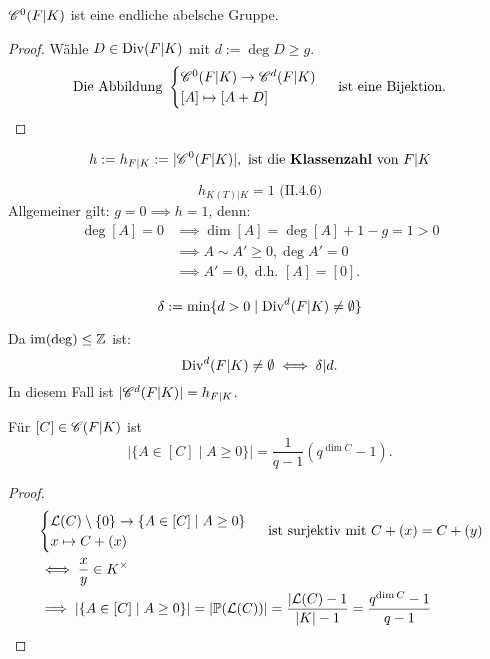 \begin{satz}
    $\Cs^0(F|K)$ ist eine endliche abelsche Gruppe.
\end{satz}
\begin{proof}
    Wähle $D \in \Div(F|K)$ mit $d:=\deg D \geq g$.
    $$ \text{Die Abbildung } \begin{cases}
        \Cs^0(F|K) \to \Cs^d(F|K)\\
        [A] \mapsto [A +D]
    \end{cases} \text{ ist eine Bijektion.}$$
\end{proof}

\begin{definition}
    \begin{align*}
        h := h_{F|K} := |\Cs^0(F|K)|, \text{ ist die \textbf{Klassenzahl} von } F|K
    \end{align*}
\end{definition}

\begin{beispiel}
    $$ h_{K(T)|K} = 1 \text{ (II.4.6)}$$
    Allgemeiner gilt: $g=0 \implies h = 1$, denn:
    \begin{align*}
        \deg [A] = 0 & \implies \dim [A] = \deg [A] + 1 -g = 1 > 0 \\
        & \implies A \sim A' \geq 0, \deg A' = 0 \\
        & \implies A' = 0, \text{ d.h. } [A] = [0].
    \end{align*}
\end{beispiel}

\begin{definition}
    $$ \delta := \min\{d > 0 \mid \Div^d(F|K) \ne \emptyset\}$$
\end{definition}

\begin{bemerkungnr}
    Da $\im(\deg) \leq \Z$ ist:
    $$ \Div^d(F|K) \ne \emptyset \iff \delta|d.$$
    In diesem Fall ist $|\Cs^d(F|K)|=h_{F|K}$.    
\end{bemerkungnr}

\begin{lemma}
    Für $[C] \in \Cs(F|K)$ ist
    $$ | \{A \in [C] \mid A \geq 0\}| = \frac{1}{q-1}(q^{\dim C}-1).$$
\end{lemma}
\begin{proof}
    \begin{align*}
        &\begin{cases}
            \mathcal{L}(C)\setminus \{0\} \to \{A \in [C] \mid A \geq 0\}\\
            x \mapsto C + (x)
        \end{cases} \text{ ist surjektiv mit } C + (x) = C + (y)\\
        &\iff \frac{x}{y} \in K^\times\\
        &\implies |\{A \in [C] \mid A \geq 0\}| = |\P(\mathcal{L}(C))| = \frac{|\mathcal{L}(C) - 1}{|K| -1} 
        = \frac{q^{\dim C}-1}{q-1}
    \end{align*}
\end{proof}


